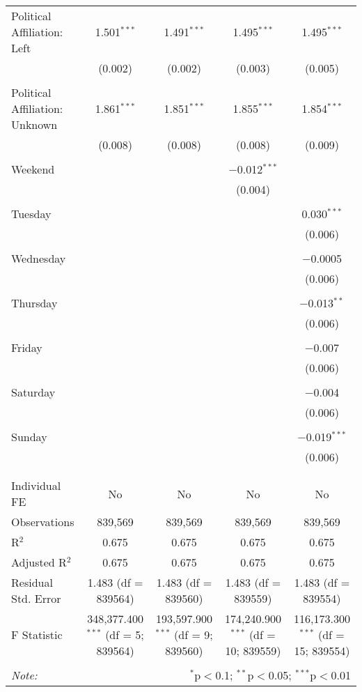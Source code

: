 \documentclass[
]{article}
\begin{document}
\begin{table}[!htbp]
{\begin{tabular}{@{\extracolsep{5pt}}lcccc}
 Political Affiliation: Left & 1.501$^{***}$ & 1.491$^{***}$ & 1.495$^{***}$ & 1.495$^{***}$ \\ 
  & (0.002) & (0.002) & (0.003) & (0.005) \\ 
  & & & & \\ 
 Political Affiliation: Unknown & 1.861$^{***}$ & 1.851$^{***}$ & 1.855$^{***}$ & 1.854$^{***}$ \\ 
  & (0.008) & (0.008) & (0.008) & (0.009) \\ 
  & & & & \\ 
 Weekend &  &  & $-$0.012$^{***}$ &  \\ 
  &  &  & (0.004) &  \\ 
  & & & & \\ 
 Tuesday &  &  &  & 0.030$^{***}$ \\ 
  &  &  &  & (0.006) \\ 
  & & & & \\ 
 Wednesday &  &  &  & $-$0.0005 \\ 
  &  &  &  & (0.006) \\ 
  & & & & \\ 
 Thursday &  &  &  & $-$0.013$^{**}$ \\ 
  &  &  &  & (0.006) \\ 
  & & & & \\ 
 Friday &  &  &  & $-$0.007 \\ 
  &  &  &  & (0.006) \\ 
  & & & & \\ 
 Saturday &  &  &  & $-$0.004 \\ 
  &  &  &  & (0.006) \\ 
  & & & & \\ 
 Sunday &  &  &  & $-$0.019$^{***}$ \\ 
  &  &  &  & (0.006) \\ 
  & & & & \\ 
\hline \\[-1.8ex] 
Individual FE & No & No & No & No \\ 
Observations & 839,569 & 839,569 & 839,569 & 839,569 \\ 
R$^{2}$ & 0.675 & 0.675 & 0.675 & 0.675 \\ 
Adjusted R$^{2}$ & 0.675 & 0.675 & 0.675 & 0.675 \\ 
Residual Std. Error & 1.483 (df = 839564) & 1.483 (df = 839560) & 1.483 (df = 839559) & 1.483 (df = 839554) \\ 
F Statistic & 348,377.400$^{***}$ (df = 5; 839564) & 193,597.900$^{***}$ (df = 9; 839560) & 174,240.900$^{***}$ (df = 10; 839559) & 116,173.300$^{***}$ (df = 15; 839554) \\ 
\hline 
\hline \\[-1.8ex] 
\textit{Note:}  & \multicolumn{4}{r}{$^{*}$p$<$0.1; $^{**}$p$<$0.05; $^{***}$p$<$0.01} \\ 
\end{tabular}
} 
\end{table} 
\newpage
\end{document}
